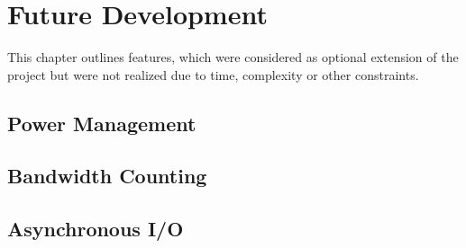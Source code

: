 \chapter{Future Development}

This chapter outlines features, which were considered as optional extension of
the project but were not realized due to time, complexity or other constraints.

\section{Power Management}


\section{Bandwidth Counting}


\section{Asynchronous I/O}


